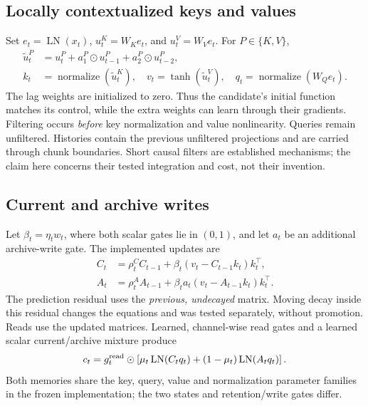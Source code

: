 \documentclass[10pt]{article}
\newcommand{\LN}{\operatorname{LN}}
\newcommand{\norm}{\operatorname{normalize}}
\begin{document}
\subsection{Locally contextualized keys and values}
Set $e_t=\LN(x_t)$, $u_t^K=W_K e_t$, and $u_t^V=W_V e_t$. For $P\in\{K,V\}$,
\begin{align}
 \widetilde u_t^P &= u_t^P + a_1^P\odot u_{t-1}^P
                              + a_2^P\odot u_{t-2}^P, \label{eq:filter}\\
 k_t &= \norm(\widetilde u_t^K),\quad
 v_t=\tanh(\widetilde u_t^V),\quad q_t=\norm(W_Qe_t).
\end{align}
The lag weights are initialized to zero. Thus the candidate's initial function
matches its control, while the extra weights can learn through their gradients.
Filtering occurs \emph{before} key normalization and value nonlinearity. Queries
remain unfiltered. Histories contain the previous unfiltered projections and
are carried through chunk boundaries. Short causal filters are established
mechanisms; the claim here concerns their tested integration and cost, not their
invention.

\subsection{Current and archive writes}
Let $\beta_t=\eta_t w_t$, where both scalar gates lie in $(0,1)$, and let
$a_t$ be an additional archive-write gate. The implemented updates are
\begin{align}
 C_t &= \rho_t^C C_{t-1}
       +\beta_t(v_t-C_{t-1}k_t)k_t^\top, \label{eq:current}\\
 A_t &= \rho_t^A A_{t-1}
       +\beta_t a_t(v_t-A_{t-1}k_t)k_t^\top. \label{eq:archive}
\end{align}
The prediction residual uses the \emph{previous, undecayed} matrix. Moving decay
inside this residual changes the equations and was tested separately, without
promotion. Reads use the updated matrices. Learned, channel-wise read gates
and a learned scalar current/archive mixture produce
\begin{equation}
 c_t=g_t^{\rm read}\odot
       \left[\mu_t\LN(C_tq_t)+(1-\mu_t)\LN(A_tq_t)\right].
\end{equation}
Both memories share the key, query, value and normalization parameter families
in the frozen implementation; the two states and retention/write gates differ.
\end{document}

